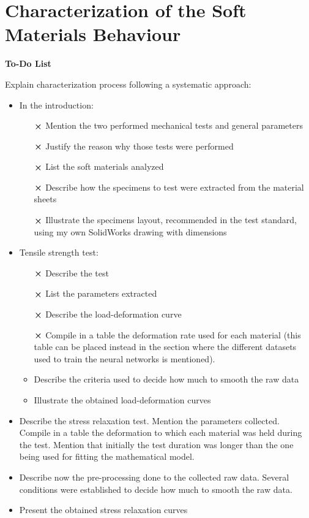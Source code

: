 \chapter{Characterization of the Soft Materials Behaviour}

\textbf{ \huge To-Do List}

Explain characterization process following a systematic approach:
\begin{itemize}
    \item In the introduction:
    \begin{itemize}
        \item[$\cross$] Mention the two performed mechanical tests and general parameters
        \item[$\cross$] Justify the reason why those tests were performed
        \item[$\cross$] List the soft materials analyzed
        \item[$\cross$] Describe how the specimens to test were extracted from the material sheets
        \item[$\cross$] Illustrate the specimens layout, recommended in the test standard, using my own SolidWorks drawing with dimensions
    \end{itemize}
    \item Tensile strength test:
    \begin{itemize}
        \item[$\cross$] Describe the test
        \item[$\cross$] List the parameters extracted
        \item[$\cross$] Describe the load-deformation curve
        \item[$\cross$] Compile in a table the deformation rate used for each material (this table can be placed instead in the section where the different datasets used to train the neural networks is mentioned).
        \item Describe the criteria used to decide how much to smooth the raw data
        \item Illustrate the obtained load-deformation curves
    \end{itemize} 
    \item Describe the stress relaxation test. Mention the parameters collected. Compile in a table the deformation to which each material was held during the test. Mention that initially the test duration was longer than the one being used for fitting the mathematical model.
    \item Describe now the pre-processing done to the collected raw data. Several conditions were established to decide how much to smooth the raw data.
    \item Present the obtained stress relaxation curves
\end{itemize}

